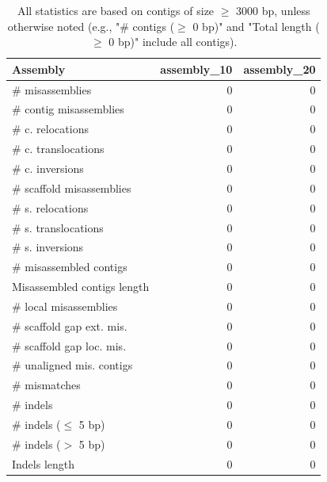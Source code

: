 \documentclass[12pt,a4paper]{article}
\begin{document}
\begin{table}[ht]
\begin{center}
\caption{All statistics are based on contigs of size $\geq$ 3000 bp, unless otherwise noted (e.g., "\# contigs ($\geq$ 0 bp)" and "Total length ($\geq$ 0 bp)" include all contigs).}
\begin{tabular}{|l*{2}{|r}|}
\hline
Assembly & assembly\_10 & assembly\_20 \\ \hline
\# misassemblies & 0 & 0 \\ \hline
\hspace{2mm}\# contig misassemblies & 0 & 0 \\ \hline
\hspace{5mm}\# c. relocations & 0 & 0 \\ \hline
\hspace{5mm}\# c. translocations & 0 & 0 \\ \hline
\hspace{5mm}\# c. inversions & 0 & 0 \\ \hline
\hspace{2mm}\# scaffold misassemblies & 0 & 0 \\ \hline
\hspace{5mm}\# s. relocations & 0 & 0 \\ \hline
\hspace{5mm}\# s. translocations & 0 & 0 \\ \hline
\hspace{5mm}\# s. inversions & 0 & 0 \\ \hline
\# misassembled contigs & 0 & 0 \\ \hline
Misassembled contigs length & 0 & 0 \\ \hline
\# local misassemblies & 0 & 0 \\ \hline
\# scaffold gap ext. mis. & 0 & 0 \\ \hline
\# scaffold gap loc. mis. & 0 & 0 \\ \hline
\# unaligned mis. contigs & 0 & 0 \\ \hline
\# mismatches & 0 & 0 \\ \hline
\# indels & 0 & 0 \\ \hline
\hspace{5mm}\# indels ($\leq$ 5 bp) & 0 & 0 \\ \hline
\hspace{5mm}\# indels ($>$ 5 bp) & 0 & 0 \\ \hline
Indels length & 0 & 0 \\ \hline
\end{tabular}
\end{center}
\end{table}
\end{document}
